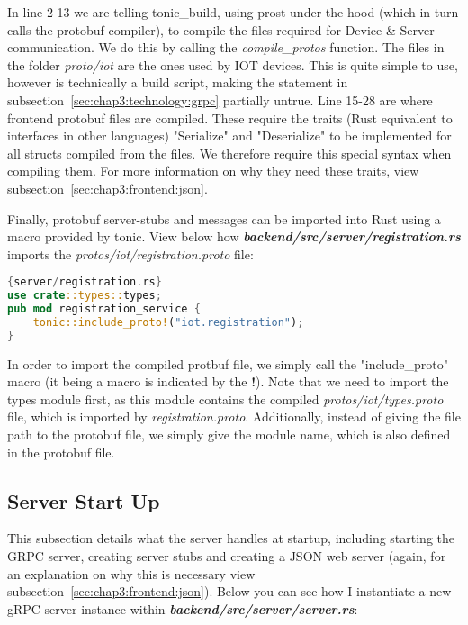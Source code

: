 In line 2-13 we are telling tonic\_build, using prost under the hood (which in turn calls the protobuf compiler), to compile the files required for Device \& Server communication. We do this by calling the \textit{compile\_protos} function. The files in the folder \textit{proto/iot} are the ones used by IOT devices. This is quite simple to use, however is technically a build script, making the statement in subsection~\ref{sec:chap3:technology:grpc} partially untrue. Line 15-28 are where frontend protobuf files are compiled. These require the traits (Rust equivalent to interfaces in other languages) "Serialize" and "Deserialize" to be implemented for all structs compiled from the files. We therefore require this special syntax when compiling them. For more information on why they need these traits, view subsection~\ref{sec:chap3:frontend:json}.

Finally, protobuf server-stubs and messages can be imported into Rust using a macro provided by tonic. View below how \textbf{\textit{backend/src/server/registration.rs}} imports the \textit{protos/iot/registration.proto} file:

\begin{lstlisting}[language=Rust, style=boxed]{server/registration.rs}
use crate::types::types;
pub mod registration_service {
    tonic::include_proto!("iot.registration");
}
\end{lstlisting}

In order to import the compiled protbuf file, we simply call the "include\_proto" macro (it being a macro is indicated by the \textbf{!}). Note that we need to import the types module first, as this module contains the compiled \textit{protos/iot/types.proto} file, which is imported by \textit{registration.proto}. Additionally, instead of giving the file path to the protobuf file, we simply give the module name, which is also defined in the protobuf file.

\subsection{Server Start Up} \label{sec:chap3:server:startup}

This subsection details what the server handles at startup, including starting the GRPC server, creating server stubs and creating a JSON web server (again, for an explanation on why this is necessary view subsection~\ref{sec:chap3:frontend:json}). Below you can see how I instantiate a new gRPC server instance within \textbf{\textit{backend/src/server/server.rs}}:

